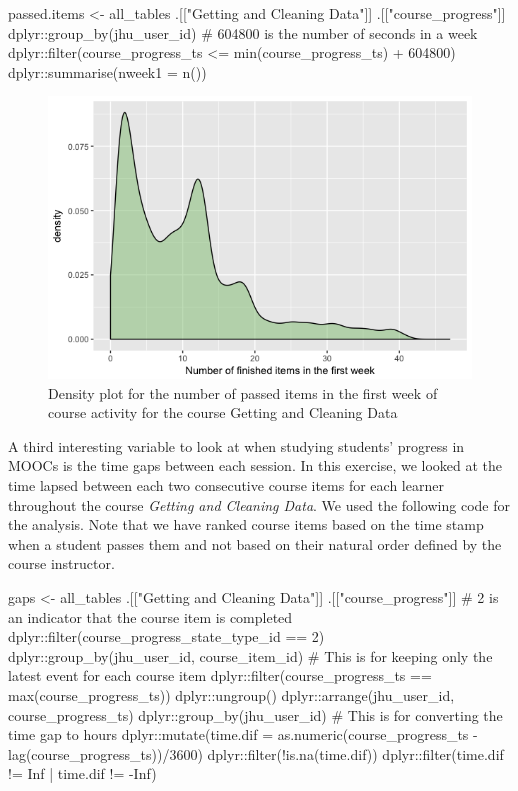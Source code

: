 \begin{Schunk}
\begin{Sinput}
passed.items <- all_tables %
    .[["Getting and Cleaning Data"]] %
    .[["course_progress"]] %
    dplyr::group_by(jhu_user_id) %
    # 604800 is the number of seconds in a week
    dplyr::filter(course_progress_ts <= min(course_progress_ts) + 604800) %
    dplyr::summarise(nweek1 = n())
\end{Sinput}
\end{Schunk}

\begin{figure}[htbp]
    \centering
    \includegraphics[scale=0.5]{passeditems}
    \caption{Density plot for the number of passed items in the first week of course activity for the course Getting and Cleaning Data}
    \label{figure:passeditems}
\end{figure}

A third interesting variable to look at when studying students' progress
in MOOCs is the time gaps between each session. In this exercise, we
looked at the time lapsed between each two consecutive course items for
each learner throughout the course \emph{Getting and Cleaning Data}. We
used the following code for the analysis. Note that we have ranked
course items based on the time stamp when a student passes them and not
based on their natural order defined by the course instructor.

\begin{Schunk}
\begin{Sinput}
gaps <- all_tables %
    .[["Getting and Cleaning Data"]] %
    .[["course_progress"]] %
    # 2 is an indicator that the course item is completed
    dplyr::filter(course_progress_state_type_id == 2) %
    dplyr::group_by(jhu_user_id, course_item_id) %
    # This is for keeping only the latest event for each course item
    dplyr::filter(course_progress_ts == max(course_progress_ts)) %
    dplyr::ungroup() %
    dplyr::arrange(jhu_user_id, course_progress_ts) %
    dplyr::group_by(jhu_user_id) %
    # This is for converting the time gap to hours
    dplyr::mutate(time.dif = as.numeric(course_progress_ts - 
                                            lag(course_progress_ts))/3600) %
    dplyr::filter(!is.na(time.dif)) %
    dplyr::filter(time.dif != Inf | time.dif != -Inf)
\end{Sinput}
\end{Schunk}

